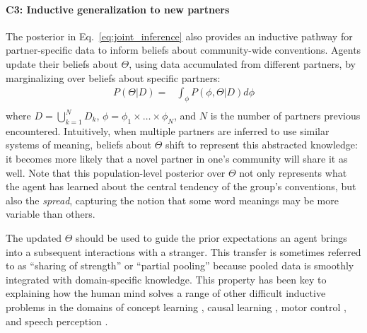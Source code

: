 \paragraph{C3: Inductive generalization to new partners}

The posterior in Eq.~\ref{eq:joint_inference} also provides an inductive pathway for partner-specific data to inform beliefs about community-wide conventions.
Agents update their beliefs about $\Theta$, using data accumulated from different partners, by marginalizing over beliefs about specific partners:
\begin{equation}
\begin{split}
    P(\Theta | D)  = & \int_{\phi} P(\phi, \Theta | D) d\phi \\
\end{split}
\end{equation}
where $D = \bigcup_{k=1}^N D_k$, $\phi = \phi_1 \times \dots \times \phi_N$, and $N$ is the number of partners previous encountered. 
Intuitively, when multiple partners are inferred to use similar systems of meaning, beliefs about $\Theta$ shift to represent this abstracted knowledge: it becomes more likely that a novel partner in one's community will share it as well.
Note that this population-level posterior over $\Theta$ not only represents what the agent has learned about the central tendency of the group's conventions, but also the \emph{spread}, capturing the notion that some word meanings may be more variable than others.

The updated $\Theta$ should be used to guide the prior expectations an agent brings into a subsequent interactions with a stranger.
This transfer is sometimes referred to as ``sharing of strength'' or ``partial pooling'' because pooled data is smoothly integrated with domain-specific knowledge.
This property has been key to explaining how the human mind solves a range of other difficult inductive problems in the domains of concept learning \cite{KempPerforsTenenbaum07_HBM, tenenbaum_how_2011}, causal learning \cite{KempGoodmanTenenbaum10_LearningToLearn,GoodmanUllmanTenenbaum11_TheoryOfCausality},  motor control \cite{berniker2008estimating}, and speech perception \cite{kleinschmidt2015robust}.

